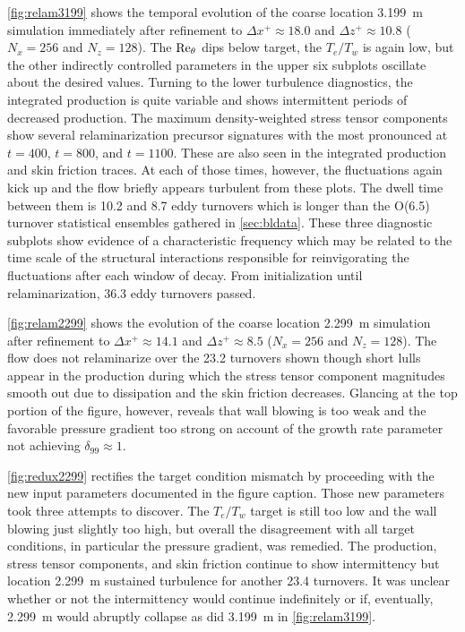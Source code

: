 \autoref{fig:relam3199} shows the temporal evolution of the
coarse location 3.199~m simulation immediately after refinement to
$\Delta{}x^{+}\approx{}18.0$ and $\Delta{}z^{+}\approx{}10.8$ ($N_x = 256$
and $N_z=128$).  The $\Reynolds[\theta]$ dips below target, the
$T_e/T_w$ is again low, but the other indirectly controlled parameters
in the upper six subplots
oscillate about the desired values.  Turning to the lower turbulence diagnostics, the
integrated production is quite variable and shows intermittent periods
of decreased production.  The maximum density-weighted stress tensor
components show several relaminarization precursor signatures with the
most pronounced at $t=400$, $t=800$, and $t=1100$.  These are also
seen in the integrated production and skin friction traces.  At each of
those times, however, the fluctuations again kick up and the flow briefly
appears turbulent from these plots.  The dwell time between them is
10.2 and 8.7 eddy turnovers which is longer than the O(6.5) turnover
statistical ensembles gathered in \autoref{sec:bldata}.
%
These three diagnostic subplots show evidence of a characteristic frequency
which may be related to the time scale of the structural interactions
responsible for reinvigorating the fluctuations after each window of decay.
%
From initialization until relaminarization,
36.3 eddy turnovers passed.

\autoref{fig:relam2299} shows the evolution of the coarse location 2.299~m
simulation after refinement to $\Delta{}x^{+}\approx{}14.1$ and
$\Delta{}z^{+}\approx{}8.5$ ($N_x = 256$ and $N_z=128$).  The flow does not
relaminarize over the 23.2 turnovers shown though short lulls appear in the
production during which the stress tensor component magnitudes smooth out due
to dissipation and the skin friction decreases.  Glancing at the top portion of
the figure, however, reveals that wall blowing is too weak and the favorable
pressure gradient too strong on account of the growth rate parameter not
achieving $\delta_{99}\approx{}1$.

\autoref{fig:redux2299} rectifies the target condition mismatch by proceeding
with the new input parameters documented in the figure caption.
Those new parameters took three attempts to discover.
The $T_e/T_w$
target is still too low and the wall blowing just slightly too high, but
overall the disagreement with all target conditions, in particular
the pressure gradient, was remedied.  The production, stress tensor components,
and skin friction continue to show intermittency but location 2.299~m sustained
turbulence for another 23.4 turnovers.  It was unclear whether or not
the intermittency would continue indefinitely or if, eventually,
2.299~m would abruptly collapse as did 3.199~m in \autoref{fig:relam3199}.


